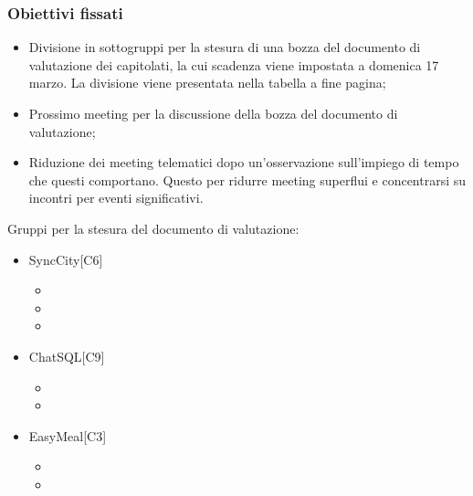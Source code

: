 \subsubsection{Obiettivi fissati}
\begin{itemize}
	\item Divisione in sottogruppi per la stesura di una bozza del documento di valutazione dei capitolati, la cui scadenza viene impostata a domenica 17 marzo. La divisione viene presentata nella tabella a fine pagina;
	\item Prossimo meeting per la discussione della bozza del documento di valutazione;
	\item Riduzione dei meeting telematici dopo un’osservazione sull’impiego di tempo che questi comportano. Questo per ridurre meeting superflui e concentrarsi su incontri per eventi significativi.
\end{itemize}
Gruppi per la stesura del documento di valutazione:
\begin{itemize}
	\item SyncCity[C6]
	\begin{itemize}
		\item \mattia
		\item \marco
		\item \tommaso
	\end{itemize}
	\item ChatSQL[C9]\begin{itemize}
		\item \sebastiano
		\item \martina
	\end{itemize}
	\item EasyMeal[C3]
	\begin{itemize}
		\item \raul
		\item \riccardo
	\end{itemize}
\end{itemize}